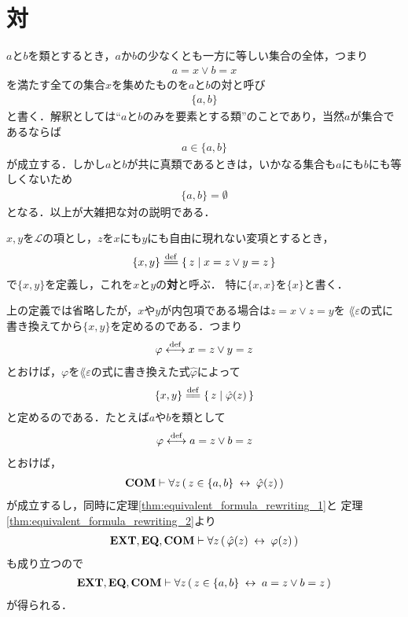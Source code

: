 \section{対}
	$a$と$b$を類とするとき，$a$か$b$の少なくとも一方に等しい集合の全体，つまり
	\begin{align}
		a = x \vee b = x
	\end{align}
	を満たす全ての集合$x$を集めたものを$a$と$b$の対と呼び
	\begin{align}
		\{a,b\}
	\end{align}
	と書く．解釈としては``$a$と$b$のみを要素とする類''のことであり，当然$a$が集合であるならば
	\begin{align}
		a \in \{a,b\}
	\end{align}
	が成立する．しかし$a$と$b$が共に真類であるときは，いかなる集合も$a$にも$b$にも等しくないため
	\begin{align}
		\{a,b\} = \emptyset
	\end{align}
	となる．以上が大雑把な対の説明である．
	
	\begin{screen}
		\begin{dfn}[対]
			$x,y$を$\mathcal{L}$の項とし，$z$を$x$にも$y$にも自由に現れない変項とするとき，
			\begin{align}
				\{x,y\} \defeq \Set{z}{x = z \vee y = z}
			\end{align}
			で$\{x,y\}$を定義し，これを$x$と$y$の{\bf 対}と呼ぶ．
			特に$\{x,x\}$を$\{x\}$と書く．
		\end{dfn}
	\end{screen}
	
	上の定義では省略したが，$x$や$y$が内包項である場合は$z = x \vee z = y$を
	$\lang{\varepsilon}$の式に書き換えてから$\{x,y\}$を定めるのである．つまり
	\begin{align}
		\varphi \overset{\mathrm{def}}{\longleftrightarrow} x = z \vee y = z
	\end{align}
	とおけば，$\varphi$を$\lang{\varepsilon}$の式に書き換えた式$\hat{\varphi}$によって
	\begin{align}
		\{x,y\} \defeq \Set{z}{\hat{\varphi}(z)}
	\end{align}
	と定めるのである．たとえば$a$や$b$を類として
	\begin{align}
		\varphi \overset{\mathrm{def}}{\longleftrightarrow} a = z \vee b = z
	\end{align}
	とおけば，
	\begin{align}
		\mbox{\bf COM} \vdash \forall z\, (\, z \in \{a,b\} \hspace{0.25em}\leftrightarrow\hspace{0.25em} \hat{\varphi}(z)\, )
	\end{align}
	が成立するし，同時に定理\ref{thm:equivalent_formula_rewriting_1}と
	定理\ref{thm:equivalent_formula_rewriting_2}より
	\begin{align}
		\mbox{{\bf EXT}},\mbox{{\bf EQ}},\mbox{\bf COM} \vdash 
		\forall z\, (\, \hat{\varphi}(z) \hspace{0.25em}\leftrightarrow\hspace{0.25em} \varphi(z)\, )
	\end{align}
	も成り立つので
	\begin{align}
		\mbox{{\bf EXT}},\mbox{{\bf EQ}},\mbox{\bf COM} \vdash 
		\forall z\, (\, z \in \{a,b\} \hspace{0.25em}\leftrightarrow\hspace{0.25em} a = z \vee b = z\, )
	\end{align}
	が得られる．
	
